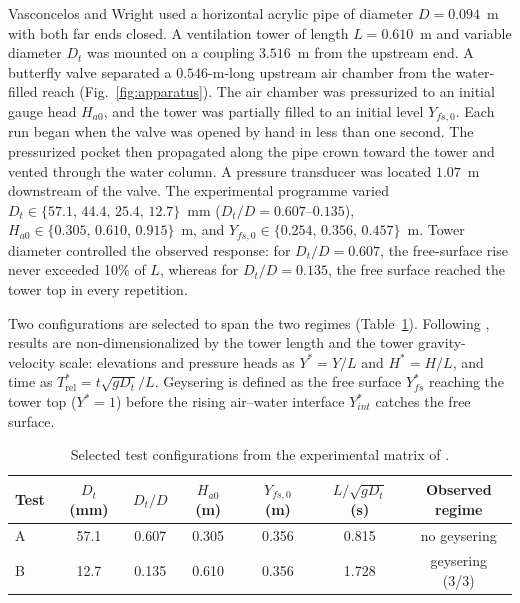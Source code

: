 Vasconcelos and Wright \cite{vasconcelos2011} used a horizontal acrylic pipe
of diameter $D=0.094$~m with both far ends closed. A ventilation tower of
length $L=0.610$~m and variable diameter $D_t$ was mounted on a coupling
$3.516$~m from the upstream end. A butterfly valve separated a
$0.546$-m-long upstream air chamber from the water-filled reach
(Fig.~\ref{fig:apparatus}). The air chamber was pressurized to an initial gauge
head $H_{a0}$, and the tower was partially filled to an initial level
$Y_{fs,0}$. Each run began when the valve was opened by hand in less than one
second. The pressurized pocket then propagated along the pipe crown toward the
tower and vented through the water column. A pressure transducer was located
$1.07$~m downstream of the valve. The experimental programme varied
$D_t\in\{57.1,\,44.4,\,25.4,\,12.7\}$~mm ($D_t/D=0.607$--$0.135$),
$H_{a0}\in\{0.305,\,0.610,\,0.915\}$~m, and
$Y_{fs,0}\in\{0.254,\,0.356,\,0.457\}$~m. Tower diameter controlled the
observed response: for $D_t/D=0.607$, the free-surface rise never exceeded
10\% of $L$, whereas for $D_t/D=0.135$, the free surface reached the tower top
in every repetition.

Two configurations are selected to span the two regimes
(Table~\ref{tab:cases}). Following \cite{vasconcelos2011}, results are
non-dimensionalized by the tower length and the tower gravity-velocity
scale: elevations and pressure heads as $Y^{*}=Y/L$ and $H^{*}=H/L$, and time
as $T_{\mathrm{rel}}^{*}=t\sqrt{gD_t}/L$. Geysering is defined as the free surface
$Y^{*}_{fs}$ reaching the tower top ($Y^{*}=1$) before the rising air--water
interface $Y^{*}_{int}$ catches the free surface.

\begin{table}[htbp]
\centering
\caption{Selected test configurations from the experimental matrix of
\cite{vasconcelos2011}.}
\label{tab:cases}
\begingroup
\small
\setlength{\tabcolsep}{3.5pt}
\begin{tabular}{@{}lcccccc@{}}
\toprule
Test & \shortstack{$D_t$\\(mm)} & $D_t/D$ & \shortstack{$H_{a0}$\\(m)} &
\shortstack{$Y_{fs,0}$\\(m)} & \shortstack{$L/\sqrt{gD_t}$\\(s)} &
\shortstack{Observed\\regime} \\
\midrule
A & 57.1 & 0.607 & 0.305 & 0.356 & 0.815 & no geysering \\
B & 12.7 & 0.135 & 0.610 & 0.356 & 1.728 & geysering (3/3) \\
\bottomrule
\end{tabular}
\endgroup
\end{table}

